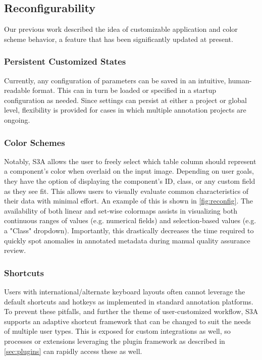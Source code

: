 \subsection{Reconfigurability}
Our previous work \cite{jessurunComponentDetectionEvaluation2020} described the idea of customizable application and color scheme behavior, a feature that has been significantly updated at present.

\subsubsection{Persistent Customized States}
Currently, any configuration of parameters can be saved in an intuitive, human-readable format. This can in turn be loaded or specified in a startup configuration as needed. Since settings can persist at either a project or global level, flexibility is provided for cases in which multiple annotation projects are ongoing.

\subsubsection{Color Schemes}
Notably, S3A allows the user to freely select which table column should represent a component's color when overlaid on the input image. Depending on user goals, they have the option of displaying the component's ID, class, or any custom field as they see fit. This allows users to visually evaluate common characteristics of their data with minimal effort. An example of this is shown in \autoref{fig:reconfig}. The availability of both linear and set-wise colormaps assists in visualizing both continuous ranges of values (e.g. numerical fields) and selection-based values (e.g. a "Class" dropdown). Importantly, this drastically decreases the time required to quickly spot anomalies in annotated metadata during manual quality assurance review.

\makeReconfigFigs

\subsubsection{Shortcuts}
Users with international/alternate keyboard layouts often cannot leverage the default shortcuts and hotkeys as implemented in standard annotation platforms. To prevent these pitfalls, and further the theme of user-customized workflow, S3A supports an adaptive shortcut framework that can be changed to suit the needs of multiple user types. This is exposed for custom integrations as well, so processes or extensions leveraging the plugin framework as described in \autoref{sec:plugins} can rapidly access these as well.

